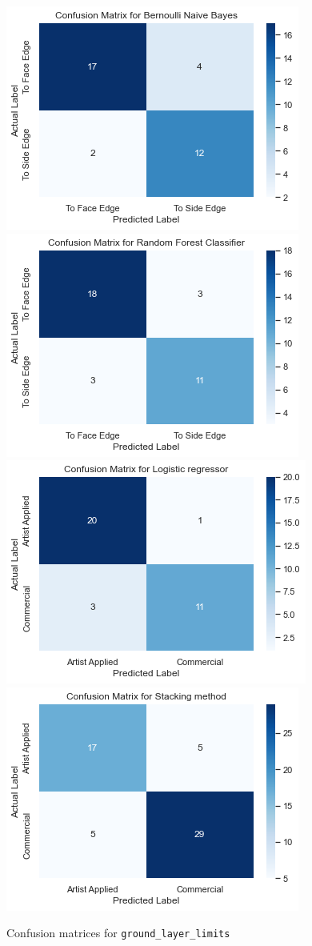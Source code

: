 \documentclass[11pt, oneside]{article}
\begin{document}
\begin{figure}[H]
\includegraphics[width=.5\textwidth]{images/matNBLim.png}\hfill
\includegraphics[width=.5\textwidth]{images/matRFLim.png} 
\\[\smallskipamount]
\includegraphics[width=.5\textwidth]{images/matLRLim.png}\hfill
\includegraphics[width=.5\textwidth]{images/matStackLim.png}\hfill
\caption{Confusion matrices for \texttt{ground\_layer\_limits}}
\label{matLim}
\end{figure}
\end{document}
